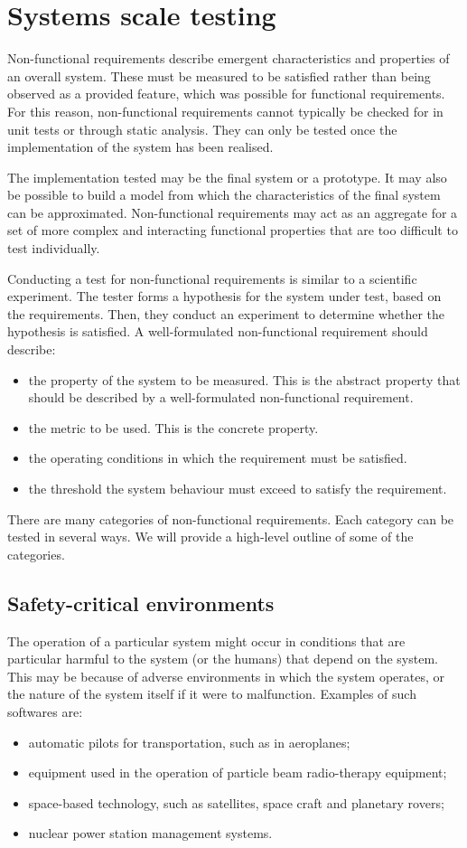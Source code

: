 \documentclass[a4paper, openany]{memoir}
\begin{document}
\chapter{Systems scale testing}
Non-functional requirements describe emergent characteristics and properties of an overall system. These must be measured to be satisfied rather than being observed as a provided feature, which was possible for functional requirements. For this reason, non-functional requirements cannot typically be checked for in unit tests or through static analysis. They can only be tested once the implementation of the system has been realised.

The implementation tested may be the final system or a prototype. It may also be possible to build a model from which the characteristics of the final system can be approximated. Non-functional requirements may act as an aggregate for a set of more complex and interacting functional properties that are too difficult to test individually.

Conducting a test for non-functional requirements is similar to a scientific experiment. The tester forms a hypothesis for the system under test, based on the requirements. Then, they conduct an experiment to determine whether the hypothesis is satisfied. A well-formulated non-functional requirement should describe:
\begin{itemize}
    \item the property of the system to be measured. This is the abstract property that should be described by a well-formulated non-functional requirement.
    \item the metric to be used. This is the concrete property.
    \item the operating conditions in which the requirement must be satisfied.
    \item the threshold the system behaviour must exceed to satisfy the requirement.
\end{itemize}

There are many categories of non-functional requirements. Each category can be tested in several ways. We will provide a high-level outline of some of the categories.

\section{Safety-critical environments}
The operation of a particular system might occur in conditions that are particular harmful to the system (or the humans) that depend on the system. This may be because of adverse environments in which the system operates, or the nature of the system itself if it were to malfunction. Examples of such softwares are: 
\begin{itemize}
    \item automatic pilots for transportation, such as in aeroplanes;
    \item equipment used in the operation of particle beam radio-therapy equipment;
    \item space-based technology, such as satellites, space craft and planetary rovers;
    \item nuclear power station management systems.
\end{itemize}
\end{document}
